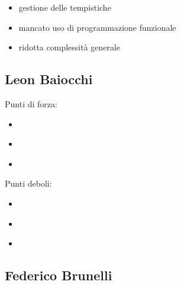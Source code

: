 \begin{itemize}
	\item gestione delle tempistiche
	\item mancato uso di programmazione funzionale
	\item ridotta complessità generale
\end{itemize}


\subsection*{Leon Baiocchi}

\textsf{\small }

\begin{flushleft}
	
\textsf{\small Punti di forza:}\\

\begin{itemize}
	\item \textsf{\small } %
	\item \textsf{\small }
	\item \textsf{\small }
\end{itemize}

\textsf{\small Punti deboli: }\\

\begin{itemize}
	\item \textsf{\small } %
	\item \textsf{\small }
	\item \textsf{\small }
\end{itemize}

\end{flushleft}



\subsection*{Federico Brunelli}

\textsf{\small }

